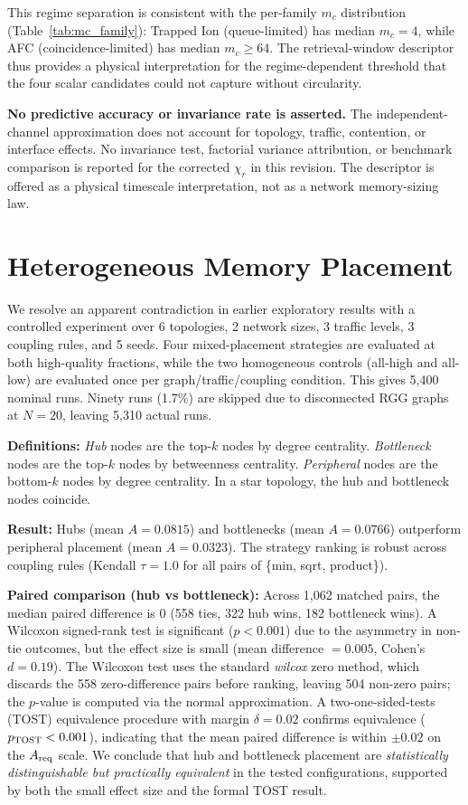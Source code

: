 \documentclass[quantumrep,article,submit,moreauthors]{Definitions/mdpi}
\begin{document}
This regime separation is consistent with the per-family $m_c$ distribution (Table~\ref{tab:mc_family}): Trapped Ion (queue-limited) has median $m_c = 4$, while AFC (coincidence-limited) has median $m_c \geq 64$. The retrieval-window descriptor thus provides a physical interpretation for the regime-dependent threshold that the four scalar candidates could not capture without circularity.

\textbf{No predictive accuracy or invariance rate is asserted.} The independent-channel approximation does not account for topology, traffic, contention, or interface effects. No invariance test, factorial variance attribution, or benchmark comparison is reported for the corrected $\chi_r$ in this revision. The descriptor is offered as a physical timescale interpretation, not as a network memory-sizing law.

\FloatBarrier

\section{Heterogeneous Memory Placement}
\label{sec:heterogeneity}

We resolve an apparent contradiction in earlier exploratory results with a controlled experiment over 6 topologies, 2 network sizes, 3 traffic levels, 3 coupling rules, and 5 seeds. Four mixed-placement strategies are evaluated at both high-quality fractions, while the two homogeneous controls (all-high and all-low) are evaluated once per graph/traffic/coupling condition. This gives 5{,}400 nominal runs. Ninety runs (1.7\%) are skipped due to disconnected RGG graphs at $N=20$, leaving 5{,}310 actual runs.

\textbf{Definitions:} \textit{Hub} nodes are the top-$k$ nodes by degree centrality. \textit{Bottleneck} nodes are the top-$k$ nodes by betweenness centrality. \textit{Peripheral} nodes are the bottom-$k$ nodes by degree centrality. In a star topology, the hub and bottleneck nodes coincide.

\textbf{Result:} Hubs (mean $A=0.0815$) and bottlenecks (mean $A=0.0766$) outperform peripheral placement (mean $A=0.0323$). The strategy ranking is robust across coupling rules (Kendall $\tau = 1.0$ for all pairs of \{min, sqrt, product\}).

\textbf{Paired comparison (hub vs bottleneck):} Across 1{,}062 matched pairs, the median paired difference is 0 (558 ties, 322 hub wins, 182 bottleneck wins). A Wilcoxon signed-rank test is significant ($p < 0.001$) due to the asymmetry in non-tie outcomes, but the effect size is small (mean difference $= 0.005$, Cohen's $d = 0.19$). The Wilcoxon test uses the standard \textit{wilcox} zero method, which discards the 558 zero-difference pairs before ranking, leaving 504 non-zero pairs; the $p$-value is computed via the normal approximation. A two-one-sided-tests (TOST) equivalence procedure with margin $\delta = 0.02$ confirms equivalence ($p_{\rm TOST} < 0.001$), indicating that the mean paired difference is within $\pm 0.02$ on the $A_{\rm req}$ scale. We conclude that hub and bottleneck placement are \textit{statistically distinguishable but practically equivalent} in the tested configurations, supported by both the small effect size and the formal TOST result.
\end{document}
